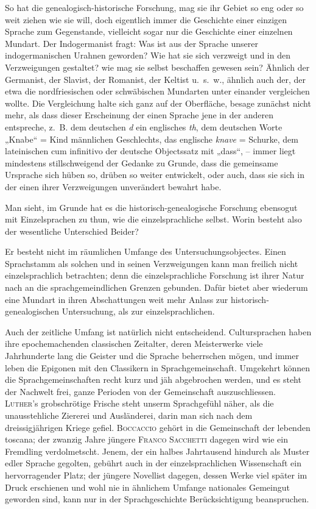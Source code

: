 So hat die genealogisch-historische Forschung, mag sie ihr Gebiet so eng oder so weit ziehen wie sie will, doch eigentlich immer die Geschichte einer einzigen Sprache zum Gegenstande, vielleicht sogar nur die Geschichte einer einzelnen Mundart. Der Indogermanist fragt: Was ist aus der Sprache unserer indogermanischen Urahnen geworden? Wie hat sie sich verzweigt und in den Verzweigungen gestaltet? wie mag sie selbst beschaffen gewesen sein? Ähnlich der Germanist, der Slavist, der Romanist, der Keltist u.~s.~w., ähnlich auch der, der etwa die nordfriesischen oder schwäbischen Mundarten unter einander vergleichen wollte. Die Vergleichung halte sich ganz auf der Oberfläche, besage zunächst \label{fp.148} nicht mehr, als dass dieser Erscheinung der einen Sprache jene in der anderen entspreche, z.~B. dem deutschen \textit{d} ein englisches \textit{th}, dem deutschen Worte „Knabe“ = Kind männlichen Geschlechts, das englische \textit{knave} = Schurke, dem lateinischen  cum infinitivo der deutsche Objectssatz mit „dass“, – immer liegt mindestens stillschweigend der Gedanke zu Grunde, dass die gemeinsame Ursprache sich hüben so, drüben so weiter entwickelt, oder auch, dass sie sich in der einen ihrer Verzweigungen unverändert bewahrt habe.

Man sieht, im Grunde hat es die historisch-genealogische Forschung ebensogut mit Einzelsprachen zu thun, wie die einzelsprachliche selbst. Worin besteht also der wesentliche Unterschied Beider?

Er besteht nicht im räumlichen Umfange des Untersuchungsobjectes. Einen Sprachstamm als solchen und in seinen Verzweigungen kann man freilich \label{sp.139} nicht einzelsprachlich betrachten; denn die einzelsprachliche Forschung ist ihrer Natur nach an die sprachgemeindlichen Grenzen gebunden. Dafür bietet aber wiederum eine Mundart in ihren Abschattungen weit mehr Anlass zur historisch-genealogischen Untersuchung, als zur einzelsprachlichen.

Auch der zeitliche Umfang ist natürlich nicht entscheidend. Cultursprachen haben ihre epochemachenden classischen Zeitalter, deren Meisterwerke viele Jahrhunderte lang die Geister und die Sprache beherrschen mögen, und immer leben die Epigonen mit den Classikern in Sprachgemeinschaft. Umgekehrt können die Sprachgemeinschaften recht kurz und jäh abgebrochen werden, und es steht der Nachwelt frei, ganze Perioden von der Gemeinschaft auszuschliessen. \textsc{Luther}’s grobschrötige Frische steht unserm Sprachgefühl näher, als die unausstehliche Ziererei und Ausländerei, darin man sich nach dem dreissigjährigen Kriege gefiel. \textsc{Boccaccio} gehört in die Gemeinschaft der lebenden  toscana; der zwanzig Jahre jüngere \textsc{Franco Sacchetti} dagegen wird wie ein Fremdling verdolmetscht. Jenem, der  ein halbes Jahrtausend hindurch als Muster edler Sprache gegolten, gebührt auch in der einzelsprachlichen Wissenschaft ein hervorragender Platz; der jüngere Novellist dagegen, dessen Werke viel später im Druck erschienen und wohl nie in ähnlichem Umfange nationales Gemeingut geworden sind, kann nur in der Sprachgeschichte Berücksichtigung beanspruchen. 

